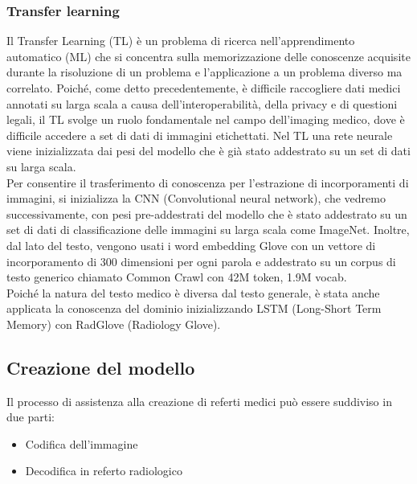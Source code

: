 \documentclass[12pt,a4paper]{report}
\begin{document}
\subsubsection{Transfer learning}
Il Transfer Learning (TL) è un problema di ricerca nell'apprendimento automatico (ML) che si concentra sulla memorizzazione delle conoscenze acquisite durante la risoluzione di un problema e l'applicazione a un problema diverso ma correlato.
Poiché, come detto precedentemente, è difficile raccogliere dati medici annotati su larga scala a causa dell'interoperabilità, della privacy e di questioni legali, il TL svolge un ruolo fondamentale nel campo dell'imaging medico, dove è difficile accedere a set di dati di immagini etichettati. Nel TL una rete neurale viene inizializzata dai pesi del modello che è già stato addestrato su un set di dati su larga scala.\\
Per consentire il trasferimento di conoscenza per l'estrazione di incorporamenti di immagini, si inizializza la CNN (Convolutional neural network), che vedremo successivamente, con pesi pre-addestrati del modello che è stato addestrato su un set di dati di classificazione delle immagini su larga scala come ImageNet. Inoltre, dal lato del testo, vengono usati i word embedding Glove \cite{pennington2014glove} con un vettore di incorporamento di 300 dimensioni per ogni parola e addestrato su un corpus di testo generico chiamato Common Crawl con 42M token, 1.9M vocab.\\
Poiché la natura del testo medico è diversa dal testo generale, è stata anche applicata la conoscenza del dominio inizializzando LSTM (Long-Short Term Memory) con RadGlove (Radiology Glove).

\subsection{Creazione del modello}
Il processo di assistenza alla creazione di referti medici può essere suddiviso in due parti:
\begin{itemize}
    \item Codifica dell’immagine
    \item Decodifica in referto radiologico
\end{itemize}
\end{document}
